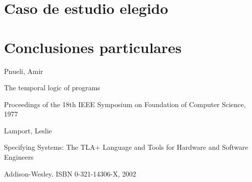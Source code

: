 \documentclass[spanish]{llncs}
\begin{document}
\section{Caso de estudio elegido}
\section{Conclusiones particulares}


%
%
\begin{thebibliography}{5}
%
Pnueli, Amir

The temporal logic of programs

Proceedings of the 18th IEEE Symposium on Foundation of Computer Science, 1977

Lamport, Leslie

Specifying Systems: The TLA+ Language and Tools for Hardware and Software Engineers

Addison-Wesley. ISBN 0-321-14306-X, 2002




\end{thebibliography}


\clearpage
{} %
\renewcommand{\indexname}{Author Index}
\printindex
\clearpage
{} %
\renewcommand{\indexname}{Subject Index}

\end{document}
